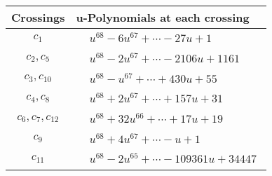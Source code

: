 \documentclass[1p]{elsarticle_modified}
\theoremstyle{definition}
\begin{document}
\begin{tabular}{m{50pt}|m{274pt}}
Crossings & \hspace{64pt}u-Polynomials at each crossing \\
\hline $$\begin{aligned}c_{1}\end{aligned}$$&$\begin{aligned}
&u^{68}-6 u^{67}+\cdots-27 u+1
\end{aligned}$\\
\hline $$\begin{aligned}c_{2},c_{5}\end{aligned}$$&$\begin{aligned}
&u^{68}-2 u^{67}+\cdots-2106 u+1161
\end{aligned}$\\
\hline $$\begin{aligned}c_{3},c_{10}\end{aligned}$$&$\begin{aligned}
&u^{68}- u^{67}+\cdots+430 u+55
\end{aligned}$\\
\hline $$\begin{aligned}c_{4},c_{8}\end{aligned}$$&$\begin{aligned}
&u^{68}+2 u^{67}+\cdots+157 u+31
\end{aligned}$\\
\hline $$\begin{aligned}c_{6},c_{7},c_{12}\end{aligned}$$&$\begin{aligned}
&u^{68}+32 u^{66}+\cdots+17 u+19
\end{aligned}$\\
\hline $$\begin{aligned}c_{9}\end{aligned}$$&$\begin{aligned}
&u^{68}+4 u^{67}+\cdots- u+1
\end{aligned}$\\
\hline $$\begin{aligned}c_{11}\end{aligned}$$&$\begin{aligned}
&u^{68}-2 u^{65}+\cdots-109361 u+34447
\end{aligned}$\\
\hline
\end{tabular}\\~\\
\newpage\renewcommand{\arraystretch}{1}
\end{document}
